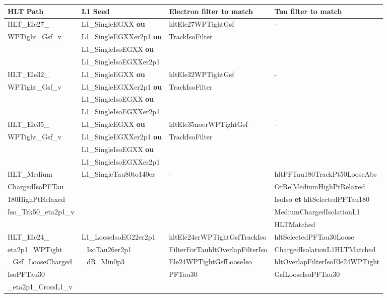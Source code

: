 {\footnotesize
\begin{tabularx}{\textwidth}{llXX}
\toprule
HLT Path & L1 Seed & Electron filter to match & Tau filter to match \\
\midrule
HLT\_Ele27\_
&
L1\_SingleEGXX \textbf{ou}
&
hltEle27WPTightGsf
&
-
\\
WPTight\_Gsf\_v
&
L1\_SingleEGXXer2p1 \textbf{ou}
&
TrackIsoFilter
\\
&
L1\_SingleIsoEGXX \textbf{ou}
\\
&
L1\_SingleIsoEGXXer2p1
\\\hline
HLT\_Ele32\_
&
L1\_SingleEGXX \textbf{ou}
&
hltEle32WPTightGsf
&
-
\\
WPTight\_Gsf\_v
&
L1\_SingleEGXXer2p1 \textbf{ou}
&
TrackIsoFilter
\\
&
L1\_SingleIsoEGXX \textbf{ou}
\\
&
L1\_SingleIsoEGXXer2p1
\\\hline
HLT\_Ele35\_
&
L1\_SingleEGXX \textbf{ou}
&
hltEle35noerWPTightGsf
&
-
\\
WPTight\_Gsf\_v
&
L1\_SingleEGXXer2p1 \textbf{ou}
&
TrackIsoFilter
\\
&
L1\_SingleIsoEGXX \textbf{ou}
\\
&
L1\_SingleIsoEGXXer2p1
\\\hline
HLT\_Medium
&
L1\_SingleTau80to140er
&
-
&
hltPFTau180TrackPt50LooseAbs
\\
ChargedIsoPFTau
&
&
&
OrRelMediumHighPtRelaxed
\\
180HighPtRelaxed
&
&
&
IsoIso \textbf{et} hltSelectedPFTau180
\\
Iso\_Trk50\_eta2p1\_v
&
&
&
MediumChargedIsolationL1
\\
&
&
&
HLTMatched
\\\hline
HLT\_Ele24\_
&
L1\_LooseIsoEG22er2p1
&
hltEle24erWPTightGsfTrackIso
&
hltSelectedPFTau30Loose
\\
eta2p1\_WPTight
&
\_IsoTau26er2p1
&
FilterForTauhltOverlapFilterIso
&
ChargedIsolationL1HLTMatched\!
\\
\_Gsf\_LooseCharged
&
\_dR\_Min0p3
&
Ele24WPTightGsfLooseIso
&
hltOverlapFilterIsoEle24WPTight\!
\\
IsoPFTau30
&
&
PFTau30
&
GsfLooseIsoPFTau30
\\
\_eta2p1\_CrossL1\_v
\\
\bottomrule
\end{tabularx}
}